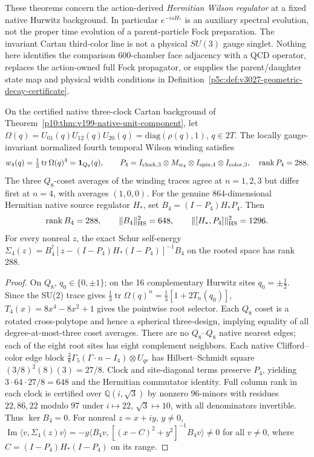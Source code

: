 \documentclass[12pt,a4paper]{article}
\begin{document}
\begin{remark}
\label{p10:rem:v368-native-onset-scope}
These theorems concern the action-derived \emph{Hermitian Wilson
regulator} at a fixed native Hurwitz background. In particular
$e^{-isH_*}$ is an auxiliary spectral evolution, not the proper
time evolution of a parent-particle Fock preparation. The invariant
Cartan third-color line is not a physical $SU(3)$ gauge singlet.
Nothing here identifies the comparison $600$-chamber face adjacency
with a QCD operator, replaces the action-owned full Fock propagator,
or supplies the parent/daughter state map and physical width conditions
in Definition~\ref{p5c:def:v3027-geometric-decay-certificate}.
\end{remark}
\begin{theorem}
\label{p10:thm:v368-wilson-root-clutch}
On the certified native three-clock Cartan background of
Theorem~\ref{p10:thm:v199-native-unit-component}, let
$\Omega(q)=U_{01}(q)U_{12}(q)U_{20}(q)=\mathrm{diag}(\rho(q),1)$,
$q\in2T$. The locally gauge-invariant normalized fourth temporal
Wilson winding satisfies
\[
 w_4(q)=\tfrac13\operatorname{tr}\Omega(q)^4
 =\mathbf1_{Q_8}(q),\qquad
 P_4=I_{\rm clock,3}\otimes M_{w_4}\otimes I_{\rm spin,4}
 \otimes I_{\rm color,3},\quad\operatorname{rank}P_4=288.
\]
The three $Q_8$-coset averages of the winding traces agree at
$n=1,2,3$ but differ first at $n=4$, with averages $(1,0,0)$.
For the genuine $864$-dimensional Hermitian native source regulator
$H_*$, set $B_4=(I-P_4)H_*P_4$. Then
\[
 \operatorname{rank}B_4=288,\qquad
 \|B_4\|_{\rm HS}^2=648,\qquad
 \|[H_*,P_4]\|_{\rm HS}^2=1296.
\]
For every nonreal $z$, the exact Schur self-energy
$\Sigma_4(z)=B_4^\dagger[z-(I-P_4)H_*(I-P_4)]^{-1}B_4$
on the rooted space has rank $288$.
\end{theorem}
\begin{proof}
On $Q_8$, $q_0\in\{0,\pm1\}$; on the 16 complementary
Hurwitz sites $q_0=\pm\frac12$. Since the SU(2) trace gives
$\frac13\operatorname{tr}\Omega(q)^n=\frac13[1+2T_n(q_0)]$,
$T_4(x)=8x^4-8x^2+1$ gives the pointwise root selector.
Each $Q_8$ coset is a rotated cross-polytope and hence a
spherical three-design, implying equality of all degree-at-most-three
coset averages. There are no $Q_8$--$Q_8$ native nearest edges;
each of the eight root sites has eight complement neighbors.
Each native Clifford--color edge block
$\frac38\Gamma_5(\Gamma\cdot n-I_4)\otimes U_{qr}$ has
Hilbert--Schmidt square $(3/8)^2(8)(3)=27/8$.
Clock and site-diagonal terms preserve $P_4$, yielding
$3\cdot64\cdot27/8=648$ and the Hermitian commutator identity.
Full column rank in each clock is certified over
$\mathbb Q(i,\sqrt3)$ by nonzero $96$-minors with residues
$22,86,22$ modulo $97$ under $i\mapsto22$,
$\sqrt3\mapsto10$, with all denominators invertible.
Thus $\ker B_4=0$. For nonreal $z=x+iy$, $y\ne0$,
$\operatorname{Im}\langle v,\Sigma_4(z)v\rangle
=-y\langle B_4v,[(x-C)^2+y^2]^{-1}B_4v\rangle\ne0$
for all $v\ne0$, where $C=(I-P_4)H_*(I-P_4)$ on its range.
\end{proof}
\end{document}

